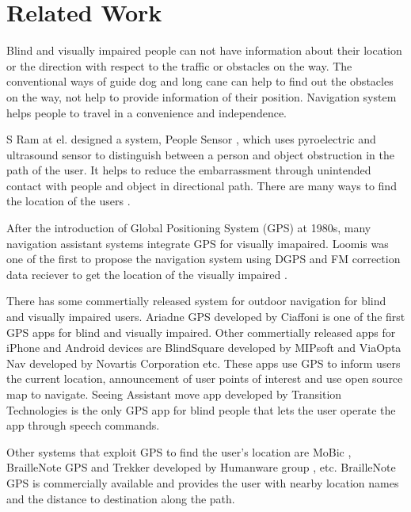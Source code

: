 \chapter{Related Work}
\label{c:relw}

Blind and visually impaired people can not have information about their location or the direction with respect to the traffic or obstacles on the way.
The conventional ways of guide dog and long cane can help to find out the obstacles on the way, not help to provide information of their position.
Navigation system helps people to travel in a convenience and independence.

S Ram at el. designed a system, People Sensor \cite{peoplesensor}, which uses pyroelectric and ultrasound sensor to distinguish between a person and object obstruction in the path of the user.
It helps to reduce the embarrassment through unintended contact with people and object in directional path.
There are many ways to find the location of the users \cite{survey}.

After the introduction of Global Positioning System (GPS) at 1980s, many navigation assistant systems integrate GPS for visually imapaired.
Loomis was one of the first to propose the navigation system using DGPS and FM correction data reciever to get the location of the visually impaired \cite{loomis1,loomis,loomis2}.

There has some commertially released system for outdoor navigation for blind and visually impaired users.
Ariadne GPS \cite{arigps} developed by Ciaffoni is one of the first GPS apps for blind and visually impaired.
Other commertially released apps for iPhone and Android devices are BlindSquare \cite{blindsq} developed by MIPsoft and ViaOpta Nav \cite{viaopta} developed by Novartis Corporation etc.
These apps use GPS to inform users the current location, announcement of user points of interest and use open source map to navigate.
Seeing Assistant move app \cite{seeing} developed by Transition Technologies is the only GPS app for blind people that lets the user operate the app through speech commands.

Other systems that exploit GPS to find the user’s location are MoBic \cite{mobic}, BrailleNote GPS and Trekker developed by Humanware group \cite{human}, etc. BrailleNote GPS is commercially available and provides the user with nearby location names and the distance to destination along the path. 


